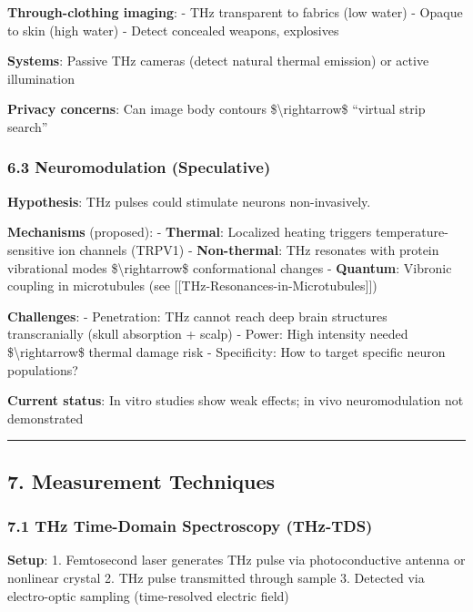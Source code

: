 \textbf{Through-clothing imaging}: - THz transparent to fabrics (low
water) - Opaque to skin (high water) - Detect concealed weapons,
explosives

\textbf{Systems}: Passive THz cameras (detect natural thermal emission)
or active illumination

\textbf{Privacy concerns}: Can image body contours
\$\textbackslash rightarrow\$ ``virtual strip search''

\subsubsection{\texorpdfstring{6.3 Neuromodulation
(Speculative)}{6.3 Neuromodulation  (Speculative)}}\label{neuromodulation-speculative}

\textbf{Hypothesis}: THz pulses could stimulate neurons non-invasively.

\textbf{Mechanisms} (proposed): - \textbf{Thermal}: Localized heating
triggers temperature-sensitive ion channels (TRPV1) -
\textbf{Non-thermal}: THz resonates with protein vibrational modes
\$\textbackslash rightarrow\$ conformational changes - \textbf{Quantum}:
Vibronic coupling in microtubules (see
{[}{[}THz-Resonances-in-Microtubules{]}{]})

\textbf{Challenges}: - Penetration: THz cannot reach deep brain
structures transcranially (skull absorption + scalp) - Power: High
intensity needed \$\textbackslash rightarrow\$ thermal damage risk -
Specificity: How to target specific neuron populations?

\textbf{Current status}: In vitro studies show weak effects; in vivo
neuromodulation not demonstrated

\begin{center}\rule{0.5\linewidth}{0.5pt}\end{center}

\subsection{7. Measurement Techniques}\label{measurement-techniques}

\subsubsection{7.1 THz Time-Domain Spectroscopy
(THz-TDS)}\label{thz-time-domain-spectroscopy-thz-tds}

\textbf{Setup}: 1. Femtosecond laser generates THz pulse via
photoconductive antenna or nonlinear crystal 2. THz pulse transmitted
through sample 3. Detected via electro-optic sampling (time-resolved
electric field)

